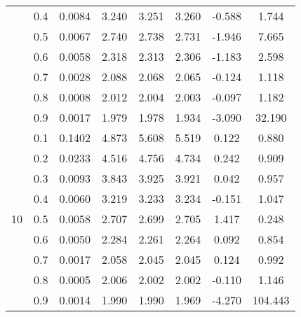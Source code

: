 \documentclass[11pt,a4paper]{report}
\begin{document}
\begin{longtable}{ | c | c || c | c | c | c | c | c | }
 & 0.4 & 0.0084 & 3.240 & 3.251 & 3.260 & -0.588 & 1.744 \\
 & 0.5 & 0.0067 & 2.740 & 2.738 & 2.731 & -1.946 & 7.665 \\
 & 0.6 & 0.0058 & 2.318 & 2.313 & 2.306 & -1.183 & 2.598 \\
 & 0.7 & 0.0028 & 2.088 & 2.068 & 2.065 & -0.124 & 1.118 \\
 & 0.8 & 0.0008 & 2.012 & 2.004 & 2.003 & -0.097 & 1.182 \\
 & 0.9 & 0.0017 & 1.979 & 1.978 & 1.934 & -3.090 & 32.190 \\
 \hline
\multirow{9}{*}{10} & 0.1 & 0.1402 & 4.873 & 5.608 & 5.519 & 0.122 & 0.880 \\
 & 0.2 & 0.0233 & 4.516 & 4.756 & 4.734 & 0.242 & 0.909 \\
 & 0.3 & 0.0093 & 3.843 & 3.925 & 3.921 & 0.042 & 0.957 \\
 & 0.4 & 0.0060 & 3.219 & 3.233 & 3.234 & -0.151 & 1.047 \\
 & 0.5 & 0.0058 & 2.707 & 2.699 & 2.705 & 1.417 & 0.248 \\
 & 0.6 & 0.0050 & 2.284 & 2.261 & 2.264 & 0.092 & 0.854 \\
 & 0.7 & 0.0017 & 2.058 & 2.045 & 2.045 & 0.124 & 0.992 \\
 & 0.8 & 0.0005 & 2.006 & 2.002 & 2.002 & -0.110 & 1.146 \\
 & 0.9 & 0.0014 & 1.990 & 1.990 & 1.969 & -4.270 & 104.443 \\
 \hline
\hline
\end{longtable}
\end{document}
